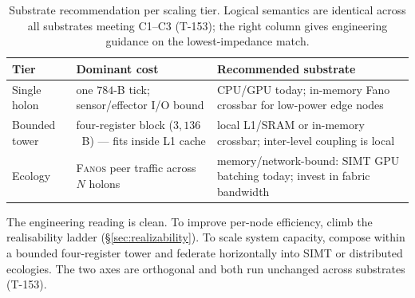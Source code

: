 \begin{table}[H]
\centering\small
\caption{Substrate recommendation per scaling tier. Logical semantics are
identical across all substrates meeting C1--C3 (T-153); the right column gives
engineering guidance on the lowest-impedance match.}
\label{tab:substrate-rec}
\begin{tabular}{@{}p{2.5cm}p{5.3cm}p{4.9cm}@{}}
\toprule
\textbf{Tier} & \textbf{Dominant cost} & \textbf{Recommended substrate} \\
\midrule
Single holon & one $784$-B tick; sensor/effector I/O bound & CPU/GPU today; in-memory Fano crossbar for low-power edge nodes \\
Bounded tower & four-register block ($3{,}136$~B) --- fits inside L1 cache & local L1/SRAM or in-memory crossbar; inter-level coupling is local \\
Ecology & \textsc{Fanos} peer traffic across $N$ holons & memory/network-bound: SIMT GPU batching today; invest in fabric bandwidth \\
\bottomrule
\end{tabular}
\end{table}

\noindent The engineering reading is clean. To improve per-node efficiency,
climb the realisability ladder (\S\ref{sec:realizability}). To scale system
capacity, compose within a bounded four-register tower and federate horizontally
into SIMT or distributed ecologies. The two axes are orthogonal and both run
unchanged across substrates (T-153).

